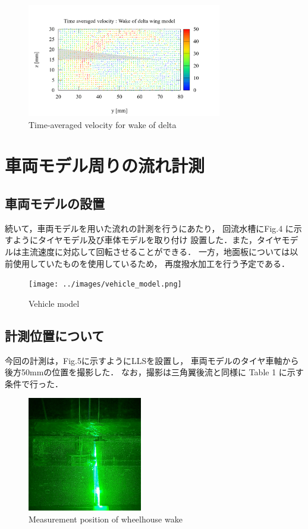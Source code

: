 \documentclass[twocolumn,a4j]{jsarticle}
\begin{document}
\begin{figure}[htbp]
  \footnotesize
  \begin{center}
    \includegraphics[width=85mm]{../images/time-averaged_velosity_of_delta_wake.png}
    \caption{Time-averaged velocity for wake of delta}
  \end{center}
\end{figure}

\newpage

\section{車両モデル周りの流れ計測}

\subsection{車両モデルの設置}
続いて，車両モデルを用いた流れの計測を行うにあたり，
回流水槽にFig.4 に示すようにタイヤモデル及び車体モデルを取り付け
設置した．また，タイヤモデルは主流速度に対応して回転させることができる．
一方，地面板については以前使用していたものを使用しているため，
再度撥水加工を行う予定である．

\begin{figure}[htbp]
  \footnotesize
  \begin{center}
    \texttt{[image: ../images/vehicle\_model.png]}
    \caption{Vehicle model}
  \end{center}
\end{figure}

\subsection*{計測位置について}
今回の計測は，Fig.5に示すようにLLSを設置し，
車両モデルのタイヤ車軸から後方50mmの位置を撮影した．
なお，撮影は三角翼後流と同様に
Table 1 に示す条件で行った．

\begin{figure}[htbp]
  \footnotesize
  \begin{center}
    \includegraphics[width=50mm]{../images/experiment.jpg}
    \caption{Measurement position of wheelhouse wake}
  \end{center}
\end{figure}
\end{document}
